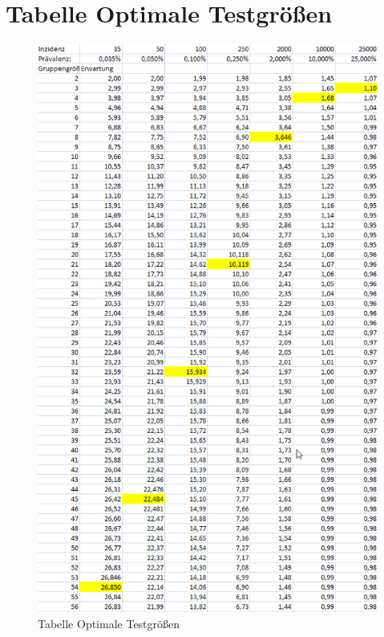 \chapter{Tabelle Optimale Testgrößen}
\begin{figure}[h]
	\centering
	\includegraphics[width=.63\textwidth]{img/TabelleOptimum}
	\caption{Tabelle Optimale Testgrößen\footnotemark}
\end{figure}
